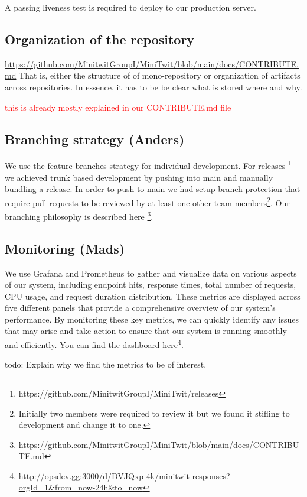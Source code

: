 \documentclass{article}
\begin{document}
A passing liveness test is required to deploy to our production server. 

\subsection{Organization of the repository}

\url{https://github.com/MinitwitGroupI/MiniTwit/blob/main/docs/CONTRIBUTE.md}
That is, either the structure of of mono-repository or organization of artifacts across repositories.
In essence, it has to be be clear what is stored where and why.

\textcolor{red}{this is already mostly explained in our CONTRIBUTE.md file}

\subsection{Branching strategy (Anders)}

We use the feature branches strategy for individual development. For releases \footnote{https://github.com/MinitwitGroupI/MiniTwit/releases} we achieved trunk based development by pushing into main and manually bundling a release. In order to push to main we had setup branch protection that require pull requests to be reviewed by at least one other team members\footnote{Initially two members were required to review it but we found it stifling to development and change it to one.}. Our branching philosophy is described here \footnote{https://github.com/MinitwitGroupI/MiniTwit/blob/main/docs/CONTRIBUTE.md}.

\subsection{Monitoring (Mads)}
We use Grafana and Prometheus to gather and visualize data on various aspects of our system, including endpoint hits, response times, total number of requests, CPU usage, and request duration distribution. These metrics are displayed across five different panels that provide a comprehensive overview of our system's performance. By monitoring these key metrics, we can quickly identify any issues that may arise and take action to ensure that our system is running smoothly and efficiently. You can find the dashboard here\footnote{\url{http://opsdev.gg:3000/d/DVJQxp-4k/minitwit-responses?orgId=1&from=now-24h&to=now}}.

todo: Explain why we find the metrics to be of interest.
\end{document}
